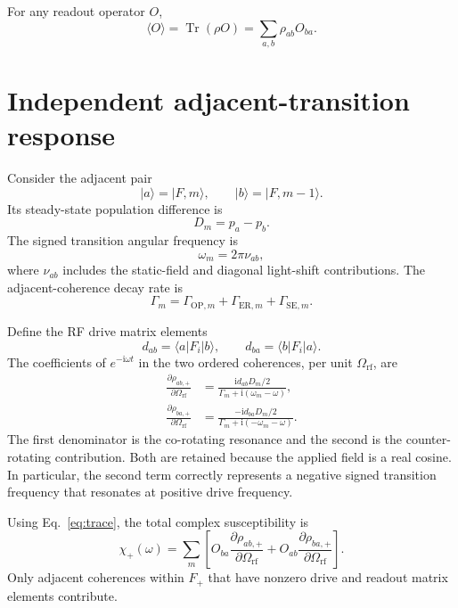\documentclass[11pt]{article}
\newcommand{\ii}{\mathrm{i}}
\newcommand{\Tr}{\operatorname{Tr}}
\newcommand{\Omrf}{\Omega_{\mathrm{rf}}}
\begin{document}
For any readout operator $O$,
\begin{equation}
  \langle O\rangle=\Tr(\rho O)=\sum_{a,b}\rho_{ab}O_{ba}.
  \label{eq:trace}
\end{equation}

\section{Independent adjacent-transition response}

Consider the adjacent pair
\begin{equation}
  |a\rangle=|F,m\rangle,\qquad |b\rangle=|F,m-1\rangle.
\end{equation}
Its steady-state population difference is
\begin{equation}
  D_m=p_a-p_b.
\end{equation}
The signed transition angular frequency is
\begin{equation}
  \omega_m=2\pi\nu_{ab},
\end{equation}
where $\nu_{ab}$ includes the static-field and diagonal light-shift
contributions.  The adjacent-coherence decay rate is
\begin{equation}
  \Gamma_m=\Gamma_{\mathrm{OP},m}
           +\Gamma_{\mathrm{ER},m}
           +\Gamma_{\mathrm{SE},m}.
  \label{eq:gamma}
\end{equation}

Define the RF drive matrix elements
\begin{equation}
  d_{ab}=\langle a|F_i|b\rangle,\qquad
  d_{ba}=\langle b|F_i|a\rangle.
\end{equation}
The coefficients of $e^{-\ii\omega t}$ in the two ordered coherences, per
unit $\Omrf$, are
\begin{align}
  \frac{\partial\rho_{ab,+}}{\partial\Omrf}
  &=\frac{\ii d_{ab}D_m/2}
          {\Gamma_m+\ii(\omega_m-\omega)},
  \label{eq:rhoab}\\
  \frac{\partial\rho_{ba,+}}{\partial\Omrf}
  &=\frac{-\ii d_{ba}D_m/2}
          {\Gamma_m+\ii(-\omega_m-\omega)}.
  \label{eq:rhoba}
\end{align}
The first denominator is the co-rotating resonance and the second is the
counter-rotating contribution.  Both are retained because the applied field
is a real cosine.  In particular, the second term correctly represents a
negative signed transition frequency that resonates at positive drive
frequency.

Using Eq.~\eqref{eq:trace}, the total complex susceptibility is
\begin{equation}
  \chi_+(\omega)=
  \sum_m\left[
    O_{ba}\frac{\partial\rho_{ab,+}}{\partial\Omrf}
   +O_{ab}\frac{\partial\rho_{ba,+}}{\partial\Omrf}
  \right].
  \label{eq:transition-sum}
\end{equation}
Only adjacent coherences within $F_+$ that have nonzero drive and readout
matrix elements contribute.
\end{document}
